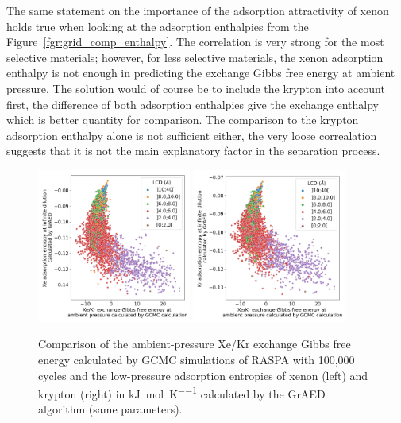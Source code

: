 \documentclass[main]{subfiles}
\begin{document}
The same statement on the importance of the adsorption attractivity of xenon holds true when looking at the adsorption enthalpies from the Figure~\ref{fgr:grid_comp_enthalpy}. The correlation is very strong for the most selective materials; however, for less selective materials, the xenon adsorption enthalpy is not enough in predicting the exchange Gibbs free energy at ambient pressure. The solution would of course be to include the krypton into account first, the difference of both adsorption enthalpies give the exchange enthalpy which is  better quantity for comparison. The comparison to the krypton adsorption enthalpy alone is not sufficient either, the very loose correalation suggests that it is not the main explanatory factor in the separation process.

\begin{figure}[ht]
  \centering
    \includegraphics[width=0.45\textwidth]{figures/3-fastsim/G_2080_vs_S_Xe_grid_overview.jpg}
    \includegraphics[width=0.45\textwidth]{figures/3-fastsim/G_2080_vs_S_Kr_grid_overview.jpg}
    \caption{Comparison of the ambient-pressure Xe/Kr exchange Gibbs free energy calculated by GCMC simulations of RASPA with 100,000 cycles and the low-pressure adsorption entropies of xenon (left) and krypton (right) in \si{\kilo\joule\per\mole\per\kelvin} calculated by the GrAED algorithm (same parameters).}\label{fgr:grid_comp_entropy}
\end{figure}
\end{document}

